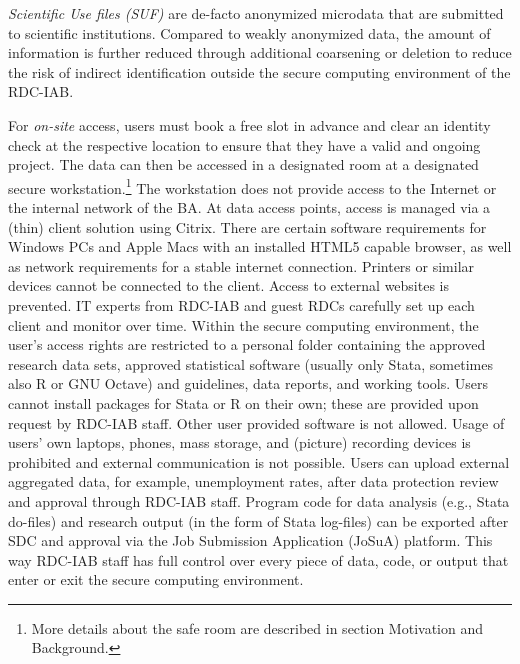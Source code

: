 \emph{Scientific Use files (SUF)} are de-facto anonymized microdata that are submitted to scientific institutions. Compared to weakly anonymized data, the amount of information is further reduced through additional coarsening or deletion to reduce the risk of indirect identification outside the secure computing environment of the RDC-IAB.

For \emph{on-site} access, users must book a free slot in advance and clear an identity check at the respective location to ensure that they have a valid and ongoing project. The data can then be accessed in a designated room at a designated secure workstation.\footnote{More details about the safe room are described in section Motivation and Background.} The workstation does not provide access to the Internet or the internal network of the BA. At data access points, access is managed via a (thin) client solution using Citrix. There are certain software requirements for Windows PCs and Apple Macs with an installed HTML5 capable browser, as well as network requirements for a stable internet connection. Printers or similar devices cannot be connected to the client. Access to external websites is prevented. IT experts from RDC-IAB and guest RDCs carefully set up each client and monitor over time. Within the secure computing environment, the user's access rights are restricted to a personal folder containing the approved research data sets, approved statistical software (usually only Stata, sometimes also R or GNU Octave) and guidelines, data reports, and working tools. Users cannot install packages for Stata or R on their own; these are provided upon request by RDC-IAB staff. Other user provided software is not allowed. Usage of users' own laptops, phones, mass storage, and (picture) recording devices is prohibited and external communication is not possible. Users can upload external aggregated data, for example, unemployment rates, after data protection review and approval through RDC-IAB staff. Program code for data analysis (e.g., Stata do-files) and research output (in the form of Stata log-files) can be exported after SDC and approval via the Job Submission Application (JoSuA) platform. This way RDC-IAB staff has full control over every piece of data, code, or output that enter or exit the secure computing environment.

